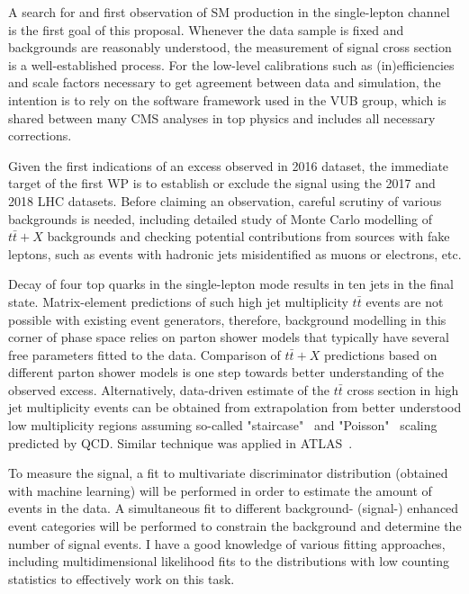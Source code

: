 
A search for and first observation of SM \fourtop production in the single-lepton channel is the first goal of this proposal. 
Whenever the data sample is fixed and backgrounds are reasonably understood, the measurement of signal cross section is a well-established process. For the low-level calibrations such as (in)efficiencies and scale factors necessary to get agreement between data and simulation, the intention is to rely on the software framework used in the VUB group, which is shared between many CMS analyses in top physics and includes all necessary corrections. 

Given the first indications of an excess observed in 2016 dataset, the immediate target of the first WP is to establish or exclude the signal using the 2017 and 2018 LHC datasets.  
Before claiming an observation, careful scrutiny of various backgrounds is needed, including detailed study of Monte Carlo modelling of $t\bar{t}+X$ backgrounds and checking potential contributions from sources with fake leptons, such as events with hadronic jets misidentified as muons or electrons, etc. 

Decay of four top quarks in the single-lepton mode results in ten jets in the final state. Matrix-element predictions of such high jet multiplicity $t\bar{t}$ events are not possible with existing event generators, therefore, background modelling in this corner of phase space relies on parton shower models that typically have several free parameters fitted to the data. Comparison of $t\bar{t}+X$ predictions based on different parton shower models is one step towards better understanding of the observed excess. Alternatively, data-driven estimate of the $t\bar{t}$ cross section in high jet multiplicity events can be obtained from extrapolation from better understood low multiplicity regions assuming so-called "staircase"~\cite{Ellis:1985vn} and "Poisson"~\cite{Gerwick:2012hq} scaling predicted by QCD. Similar technique was applied in ATLAS~\cite{Aaboud:2017faq}.

To measure the \fourtop signal, a fit to multivariate discriminator distribution (obtained with machine learning) will be performed in order to estimate the amount of \fourtop events in the data. A simultaneous fit to different background- (signal-) enhanced event categories will be performed to constrain the background and determine the number of signal events. I have a good knowledge of various fitting approaches, including multidimensional likelihood fits to the distributions with low counting statistics to effectively work on this task.

